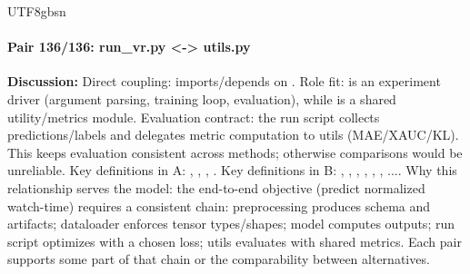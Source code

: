 \documentclass[11pt]{article}
\begin{document}
\begin{CJK*}{UTF8}{gbsn}
\paragraph{Pair 136/136: run\_vr.py <-> utils.py}
\textbf{Discussion:} Direct coupling: \texttt{} imports/depends on \texttt{}. Role fit: \texttt{} is an experiment driver (argument parsing, training loop, evaluation), while \texttt{} is a shared utility/metrics module. Evaluation contract: the run script collects predictions/labels and delegates metric computation to utils (MAE/XAUC/KL). This keeps evaluation consistent across methods; otherwise comparisons would be unreliable. Key definitions in A: \texttt{}, \texttt{}, \texttt{}, \texttt{}. Key definitions in B: \texttt{}, \texttt{}, \texttt{}, \texttt{}, \texttt{}, \texttt{}, .... Why this relationship serves the model: the end-to-end objective (predict normalized watch-time) requires a consistent chain: preprocessing produces schema and artifacts; dataloader enforces tensor types/shapes; model computes outputs; run script optimizes with a chosen loss; utils evaluates with shared metrics. Each pair supports some part of that chain or the comparability between alternatives.

\end{CJK*}
\end{document}
